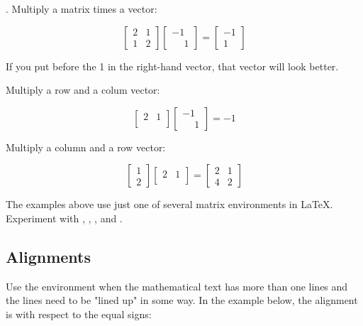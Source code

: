 . Multiply a matrix times a vector:

$$
\begin{bmatrix}
   2 & 1 \\
   1 & 2
\end{bmatrix}
\begin{bmatrix}
    -1 \\
   \phantom{-} 1
\end{bmatrix}
=
\begin{bmatrix}
   -1 \\
   1
\end{bmatrix}
$$

If you put \texarg{-} before the  1 in the right-hand vector, that vector will look better.

 Multiply a row and a colum vector:

$$
\begin{bmatrix}
   2 & 1 \\    
\end{bmatrix}
\begin{bmatrix}
    -1 \\
    \phantom{-}1
\end{bmatrix}
=
-1
$$


  Multiply a column and a row vector:

$$
\begin{bmatrix}
    1 \\
    2
\end{bmatrix}
\begin{bmatrix}
   2 & 1 \\    
\end{bmatrix}
=
\begin{bmatrix}
   2 & 1 \\
   4 & 2
\end{bmatrix}
$$



 The examples above use just one of several matrix environments in LaTeX. Experiment with , , ,  and .



\subsection{Alignments}

Use the  environment when the mathematical text has more than one lines and the lines need to be "lined up" in some way.  In the example below, the alignment is with respect to the equal signs:

